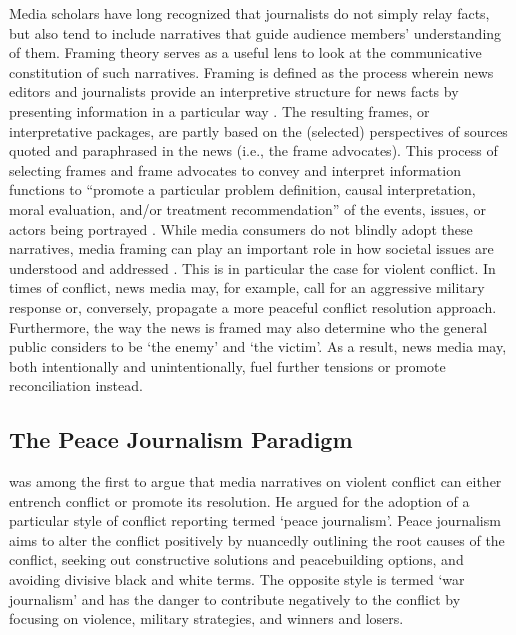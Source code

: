 Media scholars have long recognized that journalists do not simply relay facts, but also tend to include narratives that guide audience members' understanding of them. Framing theory \citep{Entman1993} serves as a useful lens to look at the communicative constitution of such narratives. Framing is defined as the process wherein news editors and journalists provide an interpretive structure for news facts by presenting information in a particular way \citep{Scheufele2014}. The resulting frames, or interpretative packages, are partly based on the (selected) perspectives of sources quoted and paraphrased in the news (i.e., the frame advocates). This process of selecting frames and frame advocates to convey and interpret information functions to ``promote a particular problem definition, causal interpretation, moral evaluation, and/or treatment recommendation'' of the events, issues, or actors being portrayed \citep[][p. 52]{Entman1993}. While media consumers do not blindly adopt these narratives, media framing can play an important role in how societal issues are understood and addressed \citep{Scheufele2014}. This is in particular the case for violent conflict. In times of conflict, news media may, for example, call for an aggressive military response or, conversely, propagate a more peaceful conflict resolution approach. Furthermore, the way the news is framed may also determine who the general public considers to be `the enemy' and `the victim'. As a result, news media may, both intentionally and unintentionally, fuel further tensions or promote reconciliation instead.


\subsection{The Peace Journalism Paradigm}
\cite{Galtung1985, Galtung1998, Galtung2006} was among the first to argue that media narratives on violent conflict can either entrench conflict or promote its resolution. He argued for the adoption of a particular style of conflict reporting termed `peace journalism'. Peace journalism aims to alter the conflict positively by nuancedly outlining the root causes of the conflict, seeking out constructive solutions and peacebuilding options, and avoiding divisive black and white terms. The opposite style is termed `war journalism' and has the danger to contribute negatively to the conflict by focusing on violence, military strategies, and winners and losers. 


